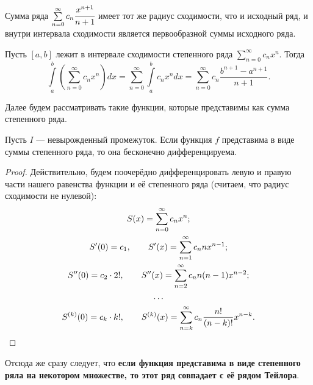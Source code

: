 \documentclass[a4paper, 12pt]{article}
\begin{document}
\begin{Consequence}
    Сумма ряда $\sum\limits_{n=0}^{\infty}c_n \cfrac{x^{n+1}}{n + 1}$ имеет тот же радиус сходимости, что и исходный ряд, и внутри интервала сходимости является первообразной суммы исходного ряда.
\end{Consequence}
\begin{Consequence}
    Пусть $[a,b]$ лежит в интервале сходимости степенного ряда $\sum\limits_{n = 0}^{\infty}c_n x^n$. Тогда 
    $$
    \int\limits_a^b\left(\sum\limits_{n = 0}^{\infty}c_n x^n\right)dx = \sum\limits_{n= 0}^{\infty} \int\limits_a^bc_n x^ndx = \sum\limits_{n=0}^\infty c_n \frac{b^{n+1} - a^{n+1}}{n+1}.
    $$
\end{Consequence}
Далее будем рассматривать такие функции, которые представимы как сумма степенного ряда.
\begin{Statement}
    Пусть $I$ --- невырожденный промежуток. Если функция $f$ представима в виде суммы степенного ряда, то она бесконечно дифференцируема.
\end{Statement}
\begin{proof}
    Действительно, будем поочерёдно дифференцировать левую и правую части нашего равенства функции и её степенного ряда (считаем, что радиус сходимости не нулевой):
    \begin{gather*}
        S(x) = \sum\limits_{n = 0}^{\infty} c_n x^n;\\
        S'(0) = c_1, \qquad S'(x) = \sum\limits_{n=1}^{\infty} c_n n x^{n-1};\\
        S''(0) = c_2\cdot 2!, \qquad S''(x) = \sum\limits_{n=2}^{\infty} c_n n(n-1) x^{n-2}; \\
        \ldots\\
        S^{(k)}(0) = c_k \cdot k!, \qquad S^{(k)}(x) = \sum\limits_{n=k}^{\infty} c_n \frac{n!}{(n-k)!} x^{n-k}.
    \end{gather*}
\end{proof}
\par Отсюда же сразу следует, что \textbf{если функция представима в виде степенного ряла на некотором множестве, то этот ряд совпадает с её рядом Тейлора}.
\end{document}
